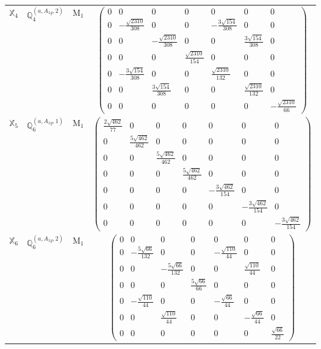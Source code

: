 \documentclass[fleqn,10pt,landscape]{article}
\begin{document}
\begin{itemize}
\begin{center}
\begin{longtable}{c|c|c|c}
$ \mathbb{X}_{4} $ & $\mathbb{Q}_{4}^{(a,A_{1g},2)}$ & M$_{1}$ & $\begin{pmatrix} 0 & 0 & 0 & 0 & 0 & 0 & 0 \\ 0 & - \frac{\sqrt{2310}}{308} & 0 & 0 & - \frac{3 \sqrt{154}}{308} & 0 & 0 \\ 0 & 0 & - \frac{\sqrt{2310}}{308} & 0 & 0 & \frac{3 \sqrt{154}}{308} & 0 \\ 0 & 0 & 0 & \frac{\sqrt{2310}}{154} & 0 & 0 & 0 \\ 0 & - \frac{3 \sqrt{154}}{308} & 0 & 0 & \frac{\sqrt{2310}}{132} & 0 & 0 \\ 0 & 0 & \frac{3 \sqrt{154}}{308} & 0 & 0 & \frac{\sqrt{2310}}{132} & 0 \\ 0 & 0 & 0 & 0 & 0 & 0 & - \frac{\sqrt{2310}}{66} \end{pmatrix}$ \\
$ \mathbb{X}_{5} $ & $\mathbb{Q}_{6}^{(a,A_{1g},1)}$ & M$_{1}$ & $\begin{pmatrix} \frac{2 \sqrt{462}}{77} & 0 & 0 & 0 & 0 & 0 & 0 \\ 0 & \frac{5 \sqrt{462}}{462} & 0 & 0 & 0 & 0 & 0 \\ 0 & 0 & \frac{5 \sqrt{462}}{462} & 0 & 0 & 0 & 0 \\ 0 & 0 & 0 & \frac{5 \sqrt{462}}{462} & 0 & 0 & 0 \\ 0 & 0 & 0 & 0 & - \frac{3 \sqrt{462}}{154} & 0 & 0 \\ 0 & 0 & 0 & 0 & 0 & - \frac{3 \sqrt{462}}{154} & 0 \\ 0 & 0 & 0 & 0 & 0 & 0 & - \frac{3 \sqrt{462}}{154} \end{pmatrix}$ \\
$ \mathbb{X}_{6} $ & $\mathbb{Q}_{6}^{(a,A_{1g},2)}$ & M$_{1}$ & $\begin{pmatrix} 0 & 0 & 0 & 0 & 0 & 0 & 0 \\ 0 & - \frac{5 \sqrt{66}}{132} & 0 & 0 & - \frac{\sqrt{110}}{44} & 0 & 0 \\ 0 & 0 & - \frac{5 \sqrt{66}}{132} & 0 & 0 & \frac{\sqrt{110}}{44} & 0 \\ 0 & 0 & 0 & \frac{5 \sqrt{66}}{66} & 0 & 0 & 0 \\ 0 & - \frac{\sqrt{110}}{44} & 0 & 0 & - \frac{\sqrt{66}}{44} & 0 & 0 \\ 0 & 0 & \frac{\sqrt{110}}{44} & 0 & 0 & - \frac{\sqrt{66}}{44} & 0 \\ 0 & 0 & 0 & 0 & 0 & 0 & \frac{\sqrt{66}}{22} \end{pmatrix}$ \\ \hline

\end{longtable}
\end{center}
\end{itemize}
\end{document}
